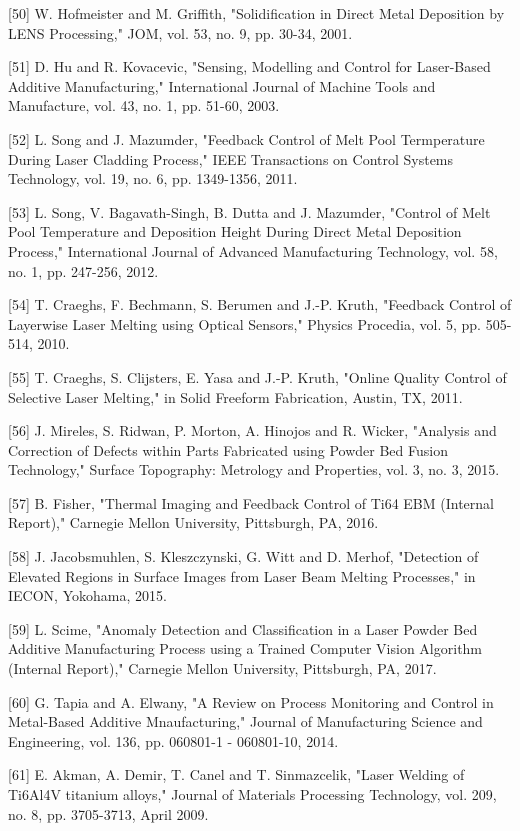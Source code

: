 \documentclass[10pt]{article}
\begin{document}
[50] W. Hofmeister and M. Griffith, "Solidification in Direct Metal Deposition by LENS Processing," JOM, vol. 53, no. 9, pp. 30-34, 2001.

[51] D. Hu and R. Kovacevic, "Sensing, Modelling and Control for Laser-Based Additive Manufacturing," International Journal of Machine Tools and Manufacture, vol. 43, no. 1, pp. 51-60, 2003.

[52] L. Song and J. Mazumder, "Feedback Control of Melt Pool Termperature During Laser Cladding Process," IEEE Transactions on Control Systems Technology, vol. 19, no. 6, pp. 1349-1356, 2011.

[53] L. Song, V. Bagavath-Singh, B. Dutta and J. Mazumder, "Control of Melt Pool Temperature and Deposition Height During Direct Metal Deposition Process," International Journal of Advanced Manufacturing Technology, vol. 58, no. 1, pp. 247-256, 2012.

[54] T. Craeghs, F. Bechmann, S. Berumen and J.-P. Kruth, "Feedback Control of Layerwise Laser Melting using Optical Sensors," Physics Procedia, vol. 5, pp. 505-514, 2010.

[55] T. Craeghs, S. Clijsters, E. Yasa and J.-P. Kruth, "Online Quality Control of Selective Laser Melting," in Solid Freeform Fabrication, Austin, TX, 2011.

[56] J. Mireles, S. Ridwan, P. Morton, A. Hinojos and R. Wicker, "Analysis and Correction of Defects within Parts Fabricated using Powder Bed Fusion Technology," Surface Topography: Metrology and Properties, vol. 3, no. 3, 2015.

[57] B. Fisher, "Thermal Imaging and Feedback Control of Ti64 EBM (Internal Report)," Carnegie Mellon University, Pittsburgh, PA, 2016.

[58] J. Jacobsmuhlen, S. Kleszczynski, G. Witt and D. Merhof, "Detection of Elevated Regions in Surface Images from Laser Beam Melting Processes," in IECON, Yokohama, 2015.

[59] L. Scime, "Anomaly Detection and Classification in a Laser Powder Bed Additive Manufacturing Process using a Trained Computer Vision Algorithm (Internal Report)," Carnegie Mellon University, Pittsburgh, PA, 2017.

[60] G. Tapia and A. Elwany, "A Review on Process Monitoring and Control in Metal-Based Additive Mnaufacturing," Journal of Manufacturing Science and Engineering, vol. 136, pp. 060801-1 - 060801-10, 2014.

[61] E. Akman, A. Demir, T. Canel and T. Sinmazcelik, "Laser Welding of Ti6Al4V titanium alloys," Journal of Materials Processing Technology, vol. 209, no. 8, pp. 3705-3713, April 2009.
\end{document}
